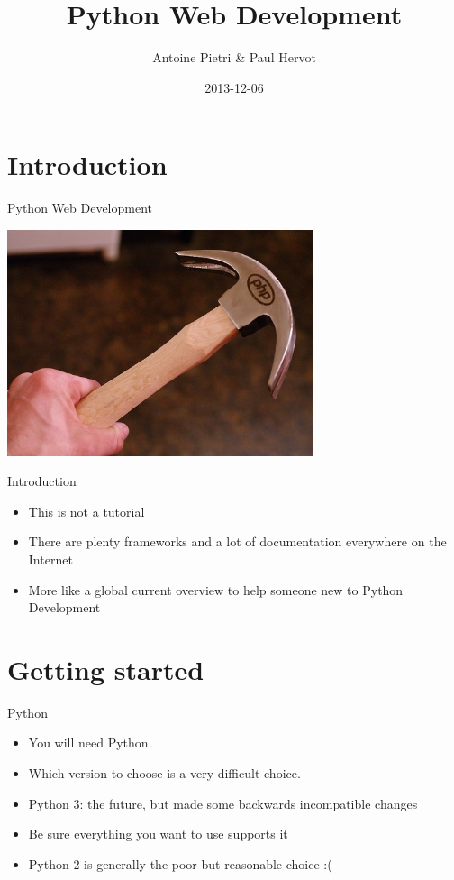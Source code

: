 \documentclass[ignorenonframetext,]{beamer}
\title{Python Web Development}
\author{Antoine Pietri \& Paul Hervot}
\date{2013-12-06}
\begin{document}
\frame{\titlepage}

\section{Introduction}\label{introduction}

\begin{frame}[fragile]{Python Web Development}

\begin{center}
\includegraphics[width=9cm]{img/php}
\end{center}

\end{frame}

\begin{frame}[fragile]{Introduction}

\begin{itemize}[<+->]
\itemsep1pt\parskip0pt
\item
  This is not a tutorial
\item
  There are plenty frameworks and a lot of documentation everywhere on
  the Internet
\item
  More like a global current overview to help someone new to Python
  Development
\end{itemize}

\end{frame}

\section{Getting started}\label{getting-started}

\begin{frame}[fragile]{Python}

\begin{itemize}[<+->]
\itemsep1pt\parskip0pt
\item
  You will need Python.
\item
  Which version to choose is a very difficult choice.
\item
  Python 3: the future, but made some backwards incompatible changes
\item
  Be sure everything you want to use supports it
\item
  Python 2 is generally the poor but reasonable choice :(
\end{itemize}

\end{frame}
\end{document}
